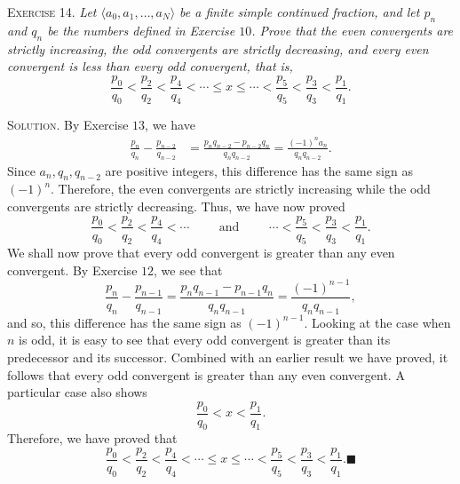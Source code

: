 \documentclass[11pt, leqno]{article}
\newcommand{\done}{\ensuremath{\blacksquare}}
\begin{document}
\textsc{Exercise 14}. \emph{Let $\langle a_0, a_1, \ldots, a_N\rangle$ be a finite simple continued fraction, and let $p_n$ and $q_n$ be the numbers defined in Exercise $10$. Prove that the even convergents are strictly increasing, the odd convergents are strictly decreasing, and every even convergent is less than every odd convergent, that is, 
\begin{displaymath}
\frac{p_0}{q_0} < \frac{p_2}{q_2} < \frac{p_4}{q_4} < \cdots \leq x \leq \cdots < \frac{p_5}{q_5} < \frac{p_3}{q_3} < \frac{p_1}{q_1}.
\end{displaymath}}

\textsc{Solution}. By Exercise $13$, we have 
\begin{align*}
\frac{p_n}{q_n} - \frac{p_{n-2}}{q_{n-2}} &= \frac{p_nq_{n-2} - p_{n-2}q_n}{q_nq_{n-2}} = \frac{(-1)^n a_n}{q_nq_{n-2}}.
\end{align*}
Since $a_n, q_n, q_{n-2}$ are positive integers, this difference has the same sign as $(-1)^n$. Therefore, the even convergents are strictly increasing while the odd convergents are strictly decreasing. Thus, we have now proved 
\begin{displaymath}
\frac{p_0}{q_0} < \frac{p_2}{q_2} < \frac{p_4}{q_4} < \cdots \hspace{1cm}\text{and}\hspace{1cm} \cdots < \frac{p_5}{q_5} < \frac{p_3}{q_3} < \frac{p_1}{q_1}.
\end{displaymath}
We shall now prove that every odd convergent is greater than any even convergent. By Exercise $12$, we see that 
\begin{displaymath}
\frac{p_n}{q_n} - \frac{p_{n-1}}{q_{n-1}} = \frac{p_nq_{n-1} - p_{n-1}q_n}{q_nq_{n-1}} = \frac{(-1)^{n-1}}{q_nq_{n-1}},
\end{displaymath}
and so, this difference has the same sign as $(-1)^{n-1}$. Looking at the case when $n$ is odd, it is easy to see that every odd convergent is greater than its predecessor and its successor. Combined with an earlier result we have proved, it follows that every odd convergent is greater than any even convergent. A particular case also shows 
\begin{displaymath}
\frac{p_0}{q_0} < x < \frac{p_1}{q_1}.
\end{displaymath}
Therefore, we have proved that 
\begin{displaymath}
\frac{p_0}{q_0} < \frac{p_2}{q_2} < \frac{p_4}{q_4} < \cdots \leq x \leq \cdots < \frac{p_5}{q_5} < \frac{p_3}{q_3} < \frac{p_1}{q_1}. \done
\end{displaymath}
\end{document}
